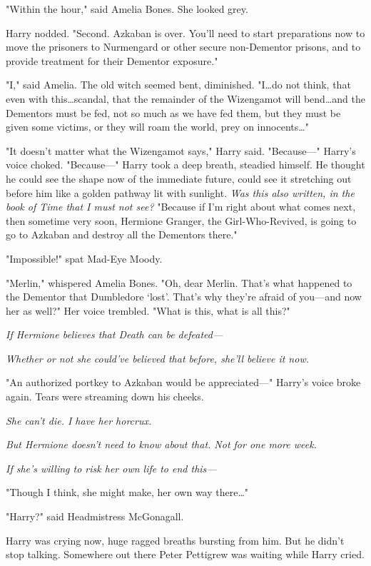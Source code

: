 "Within the hour," said Amelia Bones. She looked grey.

Harry nodded. "Second. Azkaban is over. You'll need to start preparations now
to move the prisoners to Nurmengard or other secure non-Dementor prisons, and
to provide treatment for their Dementor exposure."

"I," said Amelia. The old witch seemed bent, diminished. "I…do not
think, that even with this…scandal, that the remainder of the
Wizengamot will bend…and the Dementors must be fed, not so much as we
have fed them, but they must be given some victims, or they will roam the
world, prey on innocents…"

"It doesn't matter what the Wizengamot says," Harry said. "Because---" Harry's
voice choked. "Because---" Harry took a deep breath, steadied himself. He
thought he could see the shape now of the immediate future, could see it
stretching out before him like a golden pathway lit with sunlight. \emph{Was
this also written, in the book of Time that I must not see?} "Because if I'm
right about what comes next, then sometime very soon, Hermione Granger, the
Girl-Who-Revived, is going to go to Azkaban and destroy all the Dementors
there."

"Impossible!" spat Mad-Eye Moody.

"Merlin," whispered Amelia Bones. "Oh, dear Merlin. That's what happened to the
Dementor that Dumbledore `lost'. That's why they're afraid of you---and now her
as well?" Her voice trembled. "What is this, what is all this?"

\emph{If Hermione believes that Death can be defeated---}

\emph{Whether or not she could've believed that before, she'll believe it now.}

"An authorized portkey to Azkaban would be appreciated---" Harry's voice broke
again. Tears were streaming down his cheeks.

\emph{She can't die. I have her horcrux.}

\emph{But Hermione doesn't need to know about that. Not for one more week.}

\emph{If she's willing to risk her own life to end this---}

"Though I think, she might make, her own way there…"

"Harry?" said Headmistress McGonagall.

Harry was crying now, huge ragged breaths bursting from him. But he didn't stop
talking. Somewhere out there Peter Pettigrew was waiting while Harry cried.

